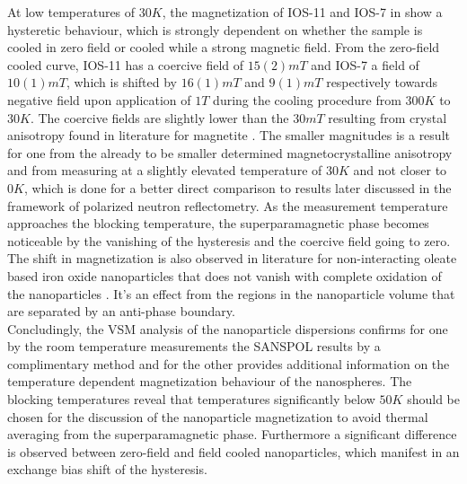 \documentclass[\main/dresen_thesis.tex]{subfiles}
\begin{document}
  At low temperatures of $30 \unit{K}$, the magnetization of IOS-11 and IOS-7 in  show a hysteretic behaviour, which is strongly dependent on whether the sample is cooled in zero field or cooled while a strong magnetic field.
  From the zero-field cooled curve, IOS-11 has a coercive field of $15(2) \unit{mT}$ and IOS-7 a field of $10(1) \unit{mT}$, which is shifted by $16(1) \unit{mT}$ and $9(1) \unit{mT}$ respectively towards negative field upon application of $1 \unit{T}$ during the cooling procedure from $300 \unit{K}$ to $30 \unit{K}$.
  The coercive fields are slightly lower than the $30 \unit{mT}$ resulting from crystal anisotropy found in literature for magnetite \cite{Cornell_2003_Their}.
  The smaller magnitudes is a result for one from the already to be smaller determined magnetocrystalline anisotropy and from measuring at a slightly elevated temperature of $30 \unit{K}$ and not closer to $0 \unit{K}$, which is done for a better direct comparison to results later discussed in the framework of polarized neutron reflectometry.
  As the measurement temperature approaches the blocking temperature, the superparamagnetic phase becomes noticeable by the vanishing of the hysteresis and the coercive field going to zero.
  The shift in magnetization is also observed in literature for non-interacting oleate based iron oxide nanoparticles that does not vanish with complete oxidation of the nanoparticles \cite{Wetterskog_2013_Anoma}.
  It's an effect from the regions in the nanoparticle volume that are separated by an anti-phase boundary.
  \\

  Concludingly, the VSM analysis of the nanoparticle dispersions confirms for one by the room temperature measurements the SANSPOL results by a complimentary method and for the other provides additional information on the temperature dependent magnetization behaviour of the nanospheres.
  The blocking temperatures reveal that temperatures significantly below $50 \unit{K}$ should be chosen for the discussion of the nanoparticle magnetization to avoid thermal averaging from the superparamagnetic phase.
  Furthermore a significant difference is observed between zero-field and field cooled nanoparticles, which manifest in an exchange bias shift of the hysteresis.
\end{document}
